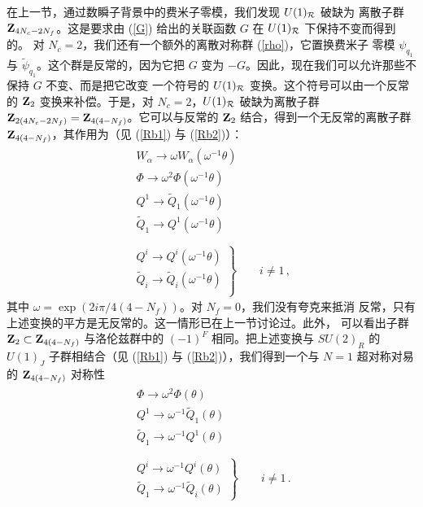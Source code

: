 在上一节，通过数瞬子背景中的费米子零模，我们发现 $U(1)_{\cal R}$ 破缺为
离散子群 ${\bf Z}_{4N_c-2N_f}$。这是要求由
(\ref{G}) 给出的关联函数 $G$ 在 $U(1)_{\cal R}$ 下保持不变而得到的。
对 $N_c=2$，我们还有一个额外的离散对称群 (\ref{rho})，它置换费米子
零模 $\psi_{q_1}$ 与 $\widetilde\psi_{q_1}$。这个群是反常的，因为它把
$G$ 变为 $-G$。因此，现在我们可以允许那些不保持 $G$ 不变、而是把它改变
一个符号的 $U(1)_{\cal R}$ 变换。这个符号可以由一个反常的 ${\bf Z}_2$
变换来补偿。于是，对 $N_c=2$，$U(1)_{\cal R}$ 破缺为离散子群 ${\bf
Z}_{2(4N_c-2N_f)}={\bf Z}_{4(4-N_f)}$。它可以与反常的 ${\bf Z}_2$
结合，得到一个无反常的离散子群 ${\bf Z}_{4(4-N_f)}$，其作用为（见
(\ref{Rb1}) 与 (\ref{Rb2})）：
$$
\begin{array}{l}
\left.\begin{array}{l}
W_{\alpha} \rightarrow \omega W_{\alpha} (\omega^{-1} \theta )\\
\Phi \rightarrow \omega^2 \Phi (\omega^{-1} \theta )\\
Q^1  \rightarrow \widetilde Q_1 (\omega^{-1} \theta )\\
\widetilde Q_1  \rightarrow Q^1 (\omega^{-1} \theta ) \\
\end{array}\right. \\
\left.\begin{array}{l}
Q^i  \rightarrow Q^i (\omega^{-1} \theta )\\
\widetilde Q_i  \rightarrow \widetilde Q_i (\omega^{-1} \theta )\\
\end{array}\right\} \qquad i\not= 1\,,
\end{array}
$$
其中 $\omega={\exp}(2i\pi/4(4-N_f))$。对 $N_f = 0$，我们没有夸克来抵消
反常，只有上述变换的平方是无反常的。这一情形已在上一节讨论过。此外，
可以看出子群 ${\bf Z}_2 \subset {\bf Z}_{4(4-N_f)}$ 与洛伦兹群中的
$(-1)^F$ 相同。把上述变换与 $SU(2)_R$ 的 $U(1)_J$ 子群相结合（见
(\ref{Rb1}) 与 (\ref{Rb2})），我们得到一个与 $N=1$ 超对称对易的
${\bf Z}_{4(4-N_f)}$ 对称性
\begin{equation}
\begin{array}{l}
\left.\begin{array}{l}
\Phi \rightarrow \omega^2 \Phi(\theta) \\
Q^1 \rightarrow \omega^{-1} \widetilde{Q}_1(\theta) \\
\widetilde{Q}_1 \rightarrow \omega^{-1} Q^1(\theta) \\
\end{array} \right.\\
\left.\begin{array}{l}
Q^i \rightarrow \omega^{-1} Q^i(\theta) \\
\widetilde{Q}_1 \rightarrow \omega^{-1} \widetilde{Q}_i(\theta) 
\end{array} \right\}
\qquad i \not= 1\,.
\end{array}
\label{symm-A}
\end{equation}

